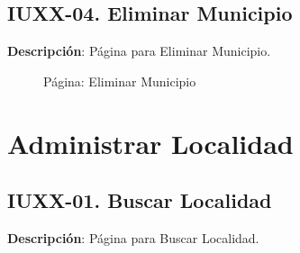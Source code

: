 \clearpage
\subsection{IUXX-04. Eliminar Municipio} \label{sec:ui-page-delete-municipio}

\textbf{Descripción}: Página para Eliminar Municipio.\\

\begin{figure}[H]
	\label{tab:ui-delete-municipio-page}
	\caption{Página: Eliminar Municipio}
\end{figure}

\begin{table}[H]
	\caption{Forma: Eliminar Municipio}
	\label{tab:ui-delete-municipio-form}
\end{table}



\clearpage
\section{Administrar Localidad} \label{sec:cf-ui-admin-localidad}

\subsection{IUXX-01. Buscar Localidad} \label{sec:ui-page-search-localidad}

\textbf{Descripción}: Página para Buscar Localidad.\\

